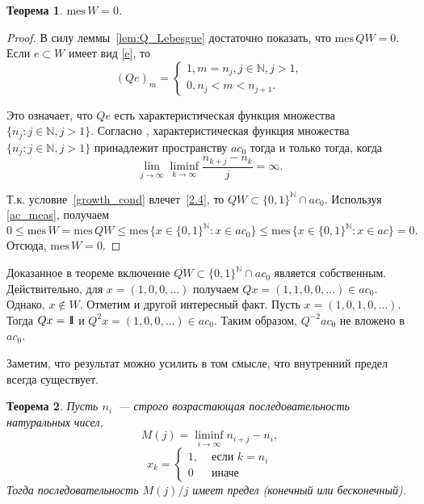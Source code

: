 \documentclass[12pt]{article}
\newcommand{\emm}{\mathrm{1\hspace{-0.3em} I}}
\newtheorem{thm}{Теорема}
\def\N{{\mathbb{N}}}
\def\mes{{\mathrm{mes}}}
\begin{document}
\begin{thm}
$\mes \, W=0$.
\end{thm}

\begin{proof}
В силу леммы~\ref{lem:Q_Lebesgue} достаточно показать, что $\mes \, QW=0$. Если $e\subset W$ имеет вид \eqref{e}, то
$$(Qe)_m=\begin{cases}
1, m=n_j, j\in\N, j>1,\\
0, n_j<m<n_{j+1}.
\end{cases}$$

Это означает, что $Qe$ есть характеристическая функция множества $\{n_j: j\in \N, j>1\}$. Согласно \cite[Лемма 1]{Avdeev2019}, характеристическая функция множества $\{n_j: j\in \N, j>1\}$ принадлежит пространству $ac_0$ тогда и только тогда, когда
\begin{equation}\label{2.4}
    \lim\limits_{j\to\infty}\liminf_{k\to\infty}\frac{n_{k+j}-n_k}j=\infty.
\end{equation}

Т.к. условие~\eqref{growth_cond} влечет~\eqref{2.4}, то $QW \subset \{0,1\}^\N \cap ac_0$. Используя \eqref{ac_meas}, получаем
$$0\le \mes \, W= \mes \, QW\le \mes \, \{x\in \{0,1\}^\N: x\in ac_0\}\le \mes \, \{x\in \{0,1\}^\N: x\in ac\}=0.$$
Отсюда, $\mes \, W=0$.
\end{proof}

Доказанное в теореме включение $QW \subset \{0,1\}^\N \cap ac_0$ является собственным. Действительно, для $x=(1, 0, 0, \dots)$ получаем $Qx=(1,1, 0, 0, \dots)\in ac_0$. Однако, $x\notin W$. Отметим и другой интересный факт. Пусть $x=(1,0,1,0,\dots)$. Тогда $Qx=\emm$ и $Q^2x=(1,0,0, \dots)\in ac_0$. Таким образом, $Q^{-2}ac_0$ не вложено в $ac_0$.


Заметим, что результат \cite[Лемма 1]{Avdeev2019} можно усилить
в том смысле, что внутренний предел всегда существует.


\begin{thm}
	Пусть $n_i$~--- строго возрастающая последовательность натуральных чисел,
	\begin{equation}
		\label{eq:definition_M_j}
		M(j) = \liminf_{i\to\infty} n_{i+j} - n_i,
	\end{equation}
	\begin{equation}
		x_k = \left\{\begin{array}{ll}
			1, & \mbox{~если~} k = n_i
			\\
			0  & \mbox{~иначе~}
		\end{array}\right.
	\end{equation}
	Тогда последовательность $M(j)/j$ имеет предел (конечный или бесконечный).
\end{thm}
\end{document}
